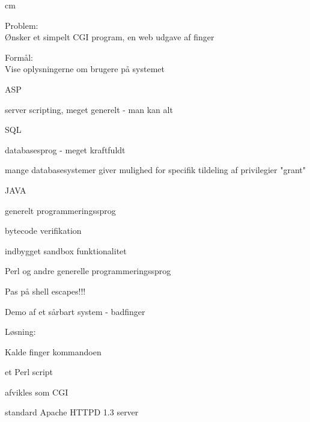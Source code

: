 \documentclass[20pt,landscape,a4paper,footrule]{foils}
\begin{document}

 cm

\begin{list1}
\item Problem:\\
Ønsker et simpelt CGI program, en web udgave af finger
\item Formål:\\
Vise oplysningerne om brugere på systemet
\end{list1}


\begin{list1}
\item ASP
\begin{list2}
\item server scripting, meget generelt - man kan alt
\end{list2}

\item SQL
\begin{list2}
\item databasesprog - meget kraftfuldt
\item mange databasesystemer giver mulighed for specifik tildeling af
  privilegier "grant"
  \end{list2}
\item JAVA
\begin{list2}
\item generelt programmeringssprog
\item bytecode verifikation
\item indbygget sandbox funktionalitet
\end{list2}
\item Perl og andre generelle programmeringssprog
\item Pas på shell escapes!!!
\end{list1}


\begin{list1}
\item Demo af et sårbart system - badfinger
\item Løsning:
\begin{list2}
\item Kalde finger kommandoen
\item et Perl script
\item afvikles som CGI
\item standard Apache HTTPD 1.3 server
\end{list2}
\end{list1}
\end{document}
